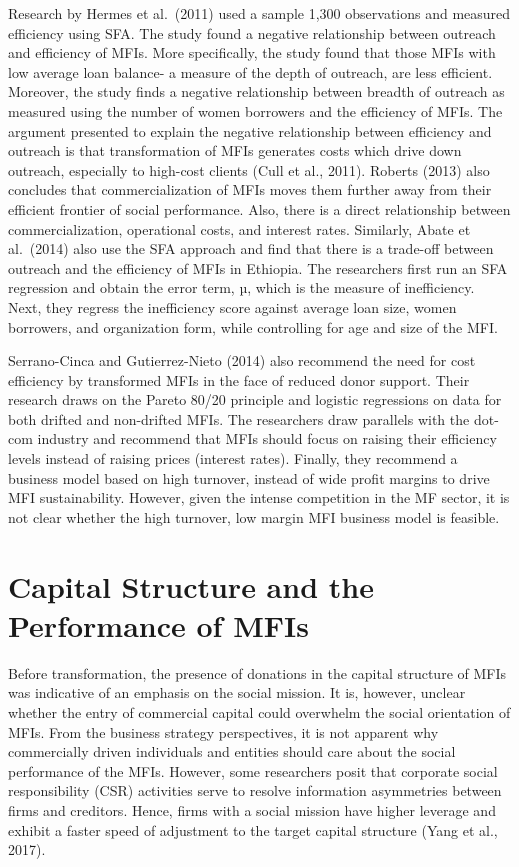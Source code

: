 \documentclass[a4paper, nobind]{templates/ociamthesis}
\begin{document}
Research by Hermes et al.~(2011) used a sample 1,300 observations and measured efficiency using SFA. The study found a negative relationship between outreach and efficiency of MFIs. More specifically, the study found that those MFIs with low average loan balance- a measure of the depth of outreach, are less efficient. Moreover, the study finds a negative relationship between breadth of outreach as measured using the number of women borrowers and the efficiency of MFIs. The argument presented to explain the negative relationship between efficiency and outreach is that transformation of MFIs generates costs which drive down outreach, especially to high-cost clients (Cull et al., 2011). Roberts (2013) also concludes that commercialization of MFIs moves them further away from their efficient frontier of social performance. Also, there is a direct relationship between commercialization, operational costs, and interest rates.
Similarly, Abate et al.~(2014) also use the SFA approach and find that there is a trade-off between outreach and the efficiency of MFIs in Ethiopia. The researchers first run an SFA regression and obtain the error term, µ, which is the measure of inefficiency. Next, they regress the inefficiency score against average loan size, women borrowers, and organization form, while controlling for age and size of the MFI.

Serrano-Cinca and Gutierrez-Nieto (2014) also recommend the need for cost efficiency by transformed MFIs in the face of reduced donor support. Their research draws on the Pareto 80/20 principle and logistic regressions on data for both drifted and non-drifted MFIs. The researchers draw parallels with the dot-com industry and recommend that MFIs should focus on raising their efficiency levels instead of raising prices (interest rates). Finally, they recommend a business model based on high turnover, instead of wide profit margins to drive MFI sustainability. However, given the intense competition in the MF sector, it is not clear whether the high turnover, low margin MFI business model is feasible.

\hypertarget{capital-structure-and-the-performance-of-mfis}{%
\section{Capital Structure and the Performance of MFIs}\label{capital-structure-and-the-performance-of-mfis}}

\noindent Before transformation, the presence of donations in the capital structure of MFIs was indicative of an emphasis on the social mission. It is, however, unclear whether the entry of commercial capital could overwhelm the social orientation of MFIs. From the business strategy perspectives, it is not apparent why commercially driven individuals and entities should care about the social performance of the MFIs. However, some researchers posit that corporate social responsibility (CSR) activities serve to resolve information asymmetries between firms and creditors. Hence, firms with a social mission have higher leverage and exhibit a faster speed of adjustment to the target capital structure (Yang et al., 2017).
\end{document}
